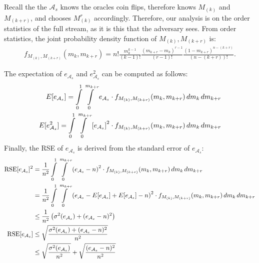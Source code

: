 Recall the the ${\mathcal{A}}_s$ knows the oracles coin
flips, therefore knows $M_{(k)}$ and $M_{(k+r)}$, and chooses $M^r_{(k)}$ accordingly. Therefore, our analysis
is on the order statistics of the full stream, as it is this that the adversary sees. From order statistics, the joint probability density
function of $M_{(k)}, M_{(k+r)}$ is:
\begin{align*}
f_{M_{(k)},M_{(k+r)}}(m_k,m_{k+r}) = n!\frac{m_k^{k-1}}{(k-1)!} \frac{(m_{k+r}-m_k)^{r-1}}{(r-1)!}\frac{(1-m_{k+r})^{n-(k+r)}}{(n-(k+r))!}.
\end{align*}

The expectation of $e_{{\mathcal{A}}_s}$ and $e_{{\mathcal{A}}_s}^2$ can be computed as follows:
\begin{equation}
    \begin{split}
    E[e_{{\mathcal{A}}_s}] = \int\limits_{0}^{1} \int\limits_{0}^{m_{k+r}} e_{{\mathcal{A}}_s} \cdot f_{M_{(k)},M_{(k+r)}}(m_k,m_{k+r}) \,dm_{k}\,dm_{k+r} \\
    E[e_{{\mathcal{A}}_s}^2] = \int\limits_{0}^{1} \int\limits_{0}^{m_{k+r}} \left[e_{{\mathcal{A}}_s} \right] ^2 \cdot f_{M_{(k)},M_{(k+r)}}(m_k,m_{k+r}) \,dm_{k}\,dm_{k+r}
    \end{split}
    \label{fc-eq:strong-expectation}
\end{equation}
Finally, the RSE of $e_{{\mathcal{A}}_s}$ is derived from the standard error of $e_{{\mathcal{A}}_s}$:
\begin{equation}
    \begin{split}
    \text{RSE}[e_{{\mathcal{A}}_s}]^2 &= \frac{1}{n^2}\int\limits_{0}^{1} \int\limits_{0}^{m_{k+r}} \left( e_{{\mathcal{A}}_s} - n \right)^2 \cdot f_{M_{(k)},M_{(k+r)}}(m_k,m_{k+r}) \,dm_{k}\,dm_{k+r} \\
    &= \frac{1}{n^2} \int\limits_{0}^{1} \int\limits_{0}^{m_{k+r}} \left( e_{{\mathcal{A}}_s} -E[e_{{\mathcal{A}}_s}] + E[e_{{\mathcal{A}}_s}] - n \right)^2 \cdot f_{M_{(k)},M_{(k+r)}}(m_k,m_{k+r}) \,dm_{k}\,dm_{k+r} \\
    &\leq \frac{1}{n^2} \left(\sigma^2(e_{{\mathcal{A}}_s}) + (e_{{\mathcal{A}}_s} - n)^2 \right)\\
    \text{RSE}[e_{{\mathcal{A}}_s}] &\leq \sqrt{\frac{\sigma^2(e_{{\mathcal{A}}_s}) + (e_{{\mathcal{A}}_s} - n)^2}{n^2}} \\
    &\leq \sqrt{\frac{\sigma^2(e_{{\mathcal{A}}_s})}{n^2}} + \sqrt{\frac{(e_{{\mathcal{A}}_s} - n)^2}{n^2}}
    \end{split}
    \label{fc-eq:strong-se-bound}
\end{equation}

